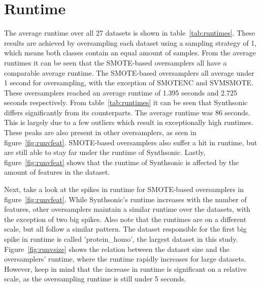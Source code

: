 \section{Runtime}
The average runtime over all 27 datasets is shown in table~\ref{tab:runtimes}. These results are achieved by oversampling each dataset using a sampling strategy of 1, which means both classes contain an equal amount of samples. From the average runtimes it can be seen that the SMOTE-based oversamplers all have a comparable average runtime. The SMOTE-based oversamplers all average under 1 second for oversampling, with the exception of SMOTENC and SVMSMOTE. These oversamplers reached an average runtime of 1.395 seconds and 2.725 seconds respectively. From table~\ref{tab:runtimes} it can be seen that Synthsonic differs significantly from its counterparts. The average runtime was 86 seconds. This is largely due to a few outliers which result in exceptionally high runtimes. These peaks are also present in other oversamplers, as seen in figure~\ref{fig:runvfeat}. SMOTE-based oversamplers also suffer a hit in runtime, but are still able to stay far under the runtime of Synthsonic. Lastly, figure~\ref{fig:runvfeat} shows that the runtime of Synthsonic is affected by the amount of features in the dataset.

Next, take a look at the spikes in runtime for SMOTE-based oversamplers in figure~\ref{fig:runvfeat}. While Synthsonic's runtime increases with the number of features, other oversamplers maintain a similar runtime over the datasets, with the exception of two big spikes. Also note that the runtimes are on a different scale, but all follow a similar pattern. The dataset responsible for the first big spike in runtime is called 'protein\_homo', the largest dataset in this study. Figure~\ref{fig:runvsize} shows the relation between the dataset size and the oversamplers' runtime, where the runtime rapidly increases for large datasets. However, keep in mind that the increase in runtime is significant on a relative scale, as the oversampling runtime is still under 5 seconds. 

